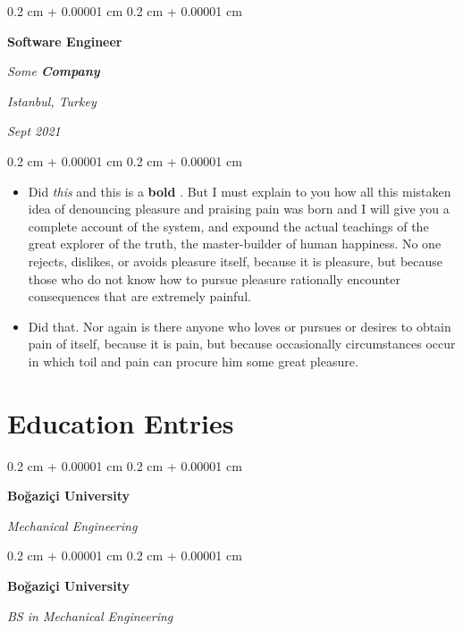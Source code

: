\documentclass[10pt, letterpaper]{article}
\newenvironment{highlights}{
    \begin{itemize}[
        topsep=0.10 cm,
        parsep=0.10 cm,
        partopsep=0pt,
        itemsep=0pt,
        leftmargin=0.4 cm + 10pt
    ]
}{
    \end{itemize}
} %
\newenvironment{onecolentry}{
    \begin{adjustwidth}{
        0.2 cm + 0.00001 cm
    }{
        0.2 cm + 0.00001 cm
    }
}{
    \end{adjustwidth}
} %
\newenvironment{twocolentry}[2][]{
    \onecolentry
    \def\secondColumn{#2}
    \setcolumnwidth{\fill, 4.5 cm}
    \begin{paracol}{2}
}{
    \switchcolumn \raggedleft \secondColumn
    \end{paracol}
    \endonecolentry
} %
\let\hrefWithoutArrow\href
\renewcommand{\href}[2]{\hrefWithoutArrow{#1}{\ifthenelse{\equal{#2}{}}{ }{#2 }\raisebox{.15ex}{\footnotesize \faExternalLink*}}}
\begin{document}
        \vspace{0.2 cm}

        \begin{twocolentry}{
        \textit{Istanbul, Turkey}    
            
        \textit{Sept 2021}}
            \textbf{Software Engineer}
            
            \textit{Some \textbf{Company}}
        \end{twocolentry}

        \vspace{0.10 cm}
        \begin{onecolentry}
            \begin{highlights}
                \item Did \textit{this} and this is a \textbf{bold} \href{https://example.com}{link}. But I must explain to you how all this mistaken idea of denouncing pleasure and praising pain was born and I will give you a complete account of the system, and expound the actual teachings of the great explorer of the truth, the master-builder of human happiness. No one rejects, dislikes, or avoids pleasure itself, because it is pleasure, but because those who do not know how to pursue pleasure rationally encounter consequences that are extremely painful.
                \item Did that. Nor again is there anyone who loves or pursues or desires to obtain pain of itself, because it is pain, but because occasionally circumstances occur in which toil and pain can procure him some great pleasure.
            \end{highlights}
        \end{onecolentry}



    
    \section{Education Entries}



        
        \begin{onecolentry}
            \textbf{Boğaziçi University}

            \textit{Mechanical Engineering}
        \end{onecolentry}



        \vspace{0.2 cm}

        \begin{onecolentry}
            \textbf{Boğaziçi University}

            \textit{BS in Mechanical Engineering}
        \end{onecolentry}
\end{document}
